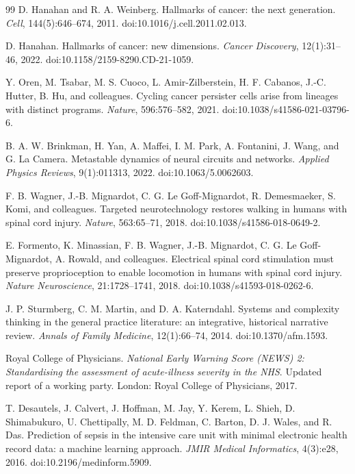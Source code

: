 \documentclass[11pt,a4paper]{article}
\newcommand{\1}{\mathbf{1}}
\begin{document}
\begin{thebibliography}{99}
D. Hanahan and R. A. Weinberg.
Hallmarks of cancer: the next generation.
\emph{Cell}, 144(5):646--674, 2011.
doi:10.1016/j.cell.2011.02.013.

D. Hanahan.
Hallmarks of cancer: new dimensions.
\emph{Cancer Discovery}, 12(1):31--46, 2022.
doi:10.1158/2159-8290.CD-21-1059.

Y. Oren, M. Tsabar, M. S. Cuoco, L. Amir-Zilberstein, H. F. Cabanos, J.-C. Hutter,
B. Hu, and colleagues.
Cycling cancer persister cells arise from lineages with distinct programs.
\emph{Nature}, 596:576--582, 2021.
doi:10.1038/s41586-021-03796-6.

B. A. W. Brinkman, H. Yan, A. Maffei, I. M. Park, A. Fontanini, J. Wang, and G. La Camera.
Metastable dynamics of neural circuits and networks.
\emph{Applied Physics Reviews}, 9(1):011313, 2022.
doi:10.1063/5.0062603.

F. B. Wagner, J.-B. Mignardot, C. G. Le Goff-Mignardot, R. Demesmaeker, S. Komi,
and colleagues.
Targeted neurotechnology restores walking in humans with spinal cord injury.
\emph{Nature}, 563:65--71, 2018.
doi:10.1038/s41586-018-0649-2.

E. Formento, K. Minassian, F. B. Wagner, J.-B. Mignardot, C. G. Le Goff-Mignardot,
A. Rowald, and colleagues.
Electrical spinal cord stimulation must preserve proprioception to enable locomotion in humans with spinal cord injury.
\emph{Nature Neuroscience}, 21:1728--1741, 2018.
doi:10.1038/s41593-018-0262-6.

J. P. Sturmberg, C. M. Martin, and D. A. Katerndahl.
Systems and complexity thinking in the general practice literature: an integrative, historical narrative review.
\emph{Annals of Family Medicine}, 12(1):66--74, 2014.
doi:10.1370/afm.1593.

Royal College of Physicians.
\emph{National Early Warning Score (NEWS) 2: Standardising the assessment of acute-illness severity in the NHS}.
Updated report of a working party. London: Royal College of Physicians, 2017.

T. Desautels, J. Calvert, J. Hoffman, M. Jay, Y. Kerem, L. Shieh, D. Shimabukuro, U. Chettipally, M. D. Feldman, C. Barton, D. J. Wales, and R. Das.
Prediction of sepsis in the intensive care unit with minimal electronic health record data: a machine learning approach.
\emph{JMIR Medical Informatics}, 4(3):e28, 2016.
doi:10.2196/medinform.5909.


\end{thebibliography}
\end{document}
